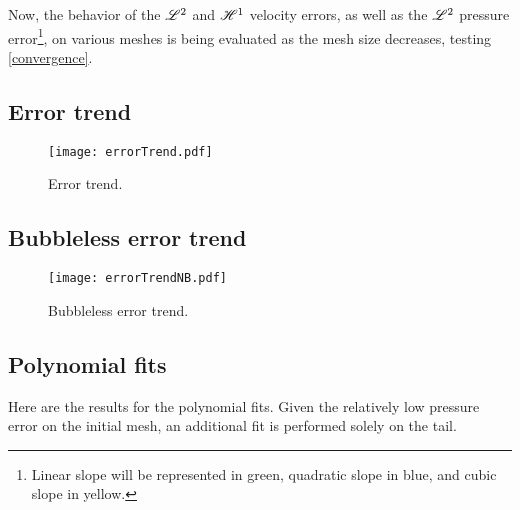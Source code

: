 Now, the behavior of the $\mathscr{L}^2$ and $\mathscr{H}^1$ velocity errors, as well as the $\mathscr{L}^2$ pressure error\footnote{Linear slope will be represented in \textcolor{solarized-green}{green}, quadratic slope in \textcolor{solarized-blue}{blue}, and cubic slope in \textcolor{solarized-yellow}{yellow}.}, on various meshes is being evaluated as the mesh size decreases, testing \ref{convergence}.


\subsection{Error trend}

\begin{figure}[!ht]
	\centering
	\texttt{[image: errorTrend.pdf]}
	\caption{Error trend.}
\end{figure}

\newpage
\subsection{Bubbleless error trend}

\begin{figure}[!ht]
	\centering
	\texttt{[image: errorTrendNB.pdf]}
	\caption{Bubbleless error trend.}
\end{figure}

\newpage
\subsection{Polynomial fits}

Here are the results for the polynomial fits. Given the relatively low pressure error on the initial mesh, an additional fit is performed solely on the tail. 


